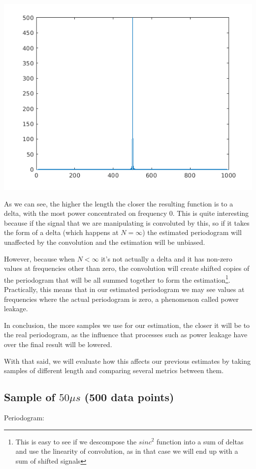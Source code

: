 \documentclass[conference,9pt]{IEEEtran}
\begin{document}
\includegraphics[scale=0.6]{triang1000.png}

As we can see, the higher the length the closer the resulting function is to a delta, with the most power concentrated on frequency 0. This is quite interesting because if the signal that we are manipulating is convoluted by this, so if it takes the form of a delta (which happens at $N=\infty$) the estimated periodogram will unaffected by the convolution and the estimation will be unbiased.

However, because when $N<\infty$ it's not actually a delta and it has non-zero values at frequencies other than zero, the convolution will create shifted copies of the periodogram that will be all summed together to form the estimation\footnote{This is easy to see if we descompose the $sinc^2$ function into a sum of deltas and use the linearity of convolution, as in that case we will end up with a sum of shifted signals}. Practically, this means that in our estimated periodogram we may see values at frequencies where the actual periodogram is zero, a phenomenon called power leakage.

In conclusion, the more samples we use for our estimation, the closer it will be to the real periodogram, as the influence that processes such as power leakage have over the final result will be lowered.

With that said, we will evaluate how this affects our previous estimates by taking samples of different length and comparing several metrics between them.

\subsection{Sample of $50\mu s$ (500 data points)}
Periodogram:
\end{document}
